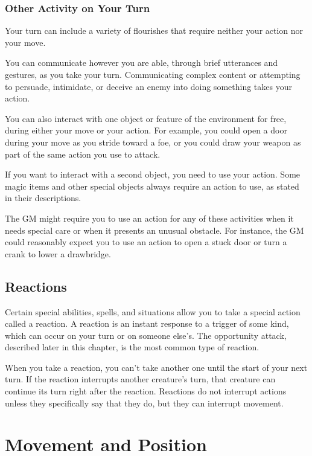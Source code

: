 \subsubsection{Other Activity on Your Turn}

Your turn can include a variety of flourishes that require neither your action nor your move.

You can communicate however you are able, through brief utterances and gestures, as you take your turn. Communicating complex content or attempting to persuade, intimidate, or deceive an enemy into doing something takes your action.

You can also interact with one object or feature of the environment for free, during either your move or your action. For example, you could open a door during your move as you stride toward a foe, or you could draw your weapon as part of the same action you use to attack.

If you want to interact with a second object, you need to use your action. Some magic items and other special objects always require an action to use, as stated in their descriptions.

The GM might require you to use an action for any of these activities when it needs special care or when it presents an unusual obstacle. For instance, the GM could reasonably expect you to use an action to open a stuck door or turn a crank to lower a drawbridge.

\subsection{Reactions}

Certain special abilities, spells, and situations allow you to take a special action called a reaction. A reaction is an instant response to a trigger of some kind, which can occur on your turn or on someone else's. The opportunity attack, described later in this chapter, is the most common type of reaction.

When you take a reaction, you can't take another one until the start of your next turn. If the reaction interrupts another creature's turn, that creature can continue its turn right after the reaction. Reactions do not interrupt actions unless they specifically say that they do, but they can interrupt movement.

\section{Movement and Position}
\label{sec:movement-and-position}

